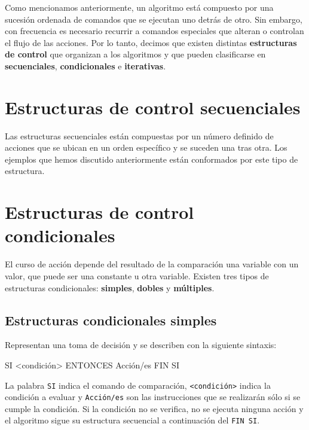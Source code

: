 \documentclass[
]{book}
\newenvironment{Shaded}{\begin{snugshade}}{\end{snugshade}}
\newcommand{\NormalTok}[1]{#1}
\begin{document}
Como mencionamos anteriormente, un algoritmo está compuesto por una sucesión ordenada de comandos que se ejecutan uno detrás de otro. Sin embargo, con frecuencia es necesario recurrir a comandos especiales que alteran o controlan el flujo de las acciones. Por lo tanto, decimos que existen distintas \textbf{estructuras de control} que organizan a los algoritmos y que pueden clasificarse en \textbf{secuenciales}, \textbf{condicionales} e \textbf{iterativas}.

\hypertarget{estructuras-de-control-secuenciales}{%
\section{Estructuras de control secuenciales}\label{estructuras-de-control-secuenciales}}

Las estructuras secuenciales están compuestas por un número definido de acciones que se ubican en un orden específico y se suceden una tras otra. Los ejemplos que hemos discutido anteriormente están conformados por este tipo de estructura.

\hypertarget{estructuras-de-control-condicionales}{%
\section{Estructuras de control condicionales}\label{estructuras-de-control-condicionales}}

El curso de acción depende del resultado de la comparación una variable con un valor, que puede ser una constante u otra variable. Existen tres tipos de estructuras condicionales: \textbf{simples}, \textbf{dobles} y \textbf{múltiples}.

\hypertarget{estructuras-condicionales-simples}{%
\subsection{Estructuras condicionales simples}\label{estructuras-condicionales-simples}}

Representan una toma de decisión y se describen con la siguiente sintaxis:

\begin{Shaded}
\begin{Highlighting}[]
\NormalTok{SI \textless{}condición\textgreater{} ENTONCES}
\NormalTok{    Acción/es}
\NormalTok{FIN SI}
\end{Highlighting}
\end{Shaded}

La palabra \texttt{SI} indica el comando de comparación, \texttt{\textless{}condición\textgreater{}} indica la condición a evaluar y \texttt{Acción/es} son las instrucciones que se realizarán sólo si se cumple la condición. Si la condición no se verifica, no se ejecuta ninguna acción y el algoritmo sigue su estructura secuencial a continuación del \texttt{FIN\ SI}.
\end{document}
